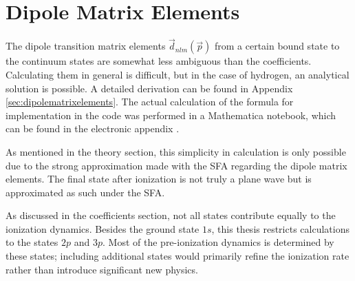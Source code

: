 





\section{Dipole Matrix Elements}
The dipole transition matrix elements $\vec{d}_{nlm}(\vec{p})$ from a certain bound state to the continuum states are somewhat less ambiguous than the coefficients. 
Calculating them in general is difficult, but in the case of hydrogen, an analytical solution is possible. A detailed derivation can be found in Appendix \ref{sec:dipolematrixelements}. 
The actual calculation of the formula for implementation in the code was performed in a Mathematica notebook, which can be found in the electronic appendix \cite{johannes_porsch_2025_16223179}.

As mentioned in the theory section, this simplicity in calculation is only possible due to the strong approximation made with the SFA regarding the dipole matrix elements. 
The final state after ionization is not truly a plane wave but is approximated as such under the SFA.

As discussed in the coefficients section, not all states contribute equally to the ionization dynamics. 
Besides the ground state $1s$, this thesis restricts calculations to the states $2p$ and $3p$. Most of the pre-ionization dynamics is determined by these states; including additional states would primarily refine the ionization rate rather than introduce significant new physics.

